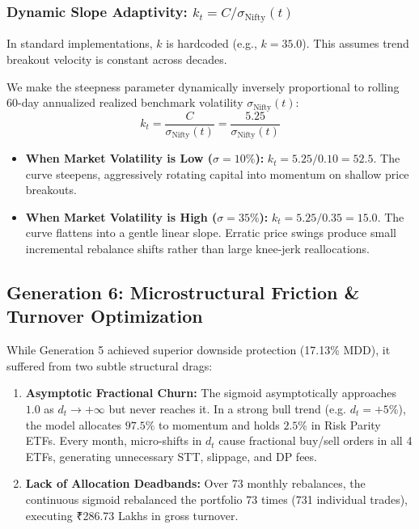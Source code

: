 \documentclass[11pt,a4paper]{article}
\begin{document}
\subsubsection{Dynamic Slope Adaptivity: $k_t = C / \sigma_{\text{Nifty}}(t)$}
In standard implementations, $k$ is hardcoded (e.g., $k = 35.0$). This assumes trend breakout velocity is constant across decades.

We make the steepness parameter dynamically inversely proportional to rolling 60-day annualized realized benchmark volatility $\sigma_{\text{Nifty}}(t)$:
\begin{equation}
k_t = \frac{C}{\sigma_{\text{Nifty}}(t)} = \frac{5.25}{\sigma_{\text{Nifty}}(t)}
\end{equation}
\begin{itemize}[leftmargin=*]
    \item \textbf{When Market Volatility is Low ($\sigma = 10\%$):} $k_t = 5.25 / 0.10 = 52.5$. The curve steepens, aggressively rotating capital into momentum on shallow price breakouts.
    \item \textbf{When Market Volatility is High ($\sigma = 35\%$):} $k_t = 5.25 / 0.35 = 15.0$. The curve flattens into a gentle linear slope. Erratic price swings produce small incremental rebalance shifts rather than large knee-jerk reallocations.
\end{itemize}

\subsection{Generation 6: Microstructural Friction \& Turnover Optimization}
While Generation 5 achieved superior downside protection (17.13\% MDD), it suffered from two subtle structural drags:
\begin{enumerate}
    \item \textbf{Asymptotic Fractional Churn:} The sigmoid asymptotically approaches $1.0$ as $d_t \to +\infty$ but never reaches it. In a strong bull trend (e.g. $d_t = +5\%$), the model allocates $97.5\%$ to momentum and holds $2.5\%$ in Risk Parity ETFs. Every month, micro-shifts in $d_t$ cause fractional buy/sell orders in all 4 ETFs, generating unnecessary STT, slippage, and DP fees.
    \item \textbf{Lack of Allocation Deadbands:} Over 73 monthly rebalances, the continuous sigmoid rebalanced the portfolio 73 times (731 individual trades), executing ₹286.73 Lakhs in gross turnover.
\end{enumerate}
\end{document}
